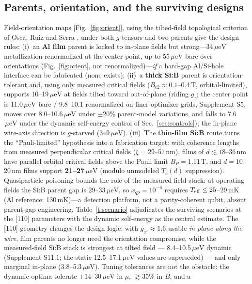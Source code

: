 \documentclass[11pt]{article}
\newcommand{\ueV}{\,\mu\mathrm{eV}}
\begin{document}
\subsection{Parents, orientation, and the surviving designs}\label{sec:parents}
Field-orientation maps [Fig.~\ref{fig:orient}], using the tilted-field
topological criterion of Osca, Ruiz and Serra \cite{osca}, under both
$g$-tensors and two parents give the design rules: (i)~an \textbf{Al film} parent is locked to in-plane fields but
strong---34$\ueV$ metallization-renormalized at the center point, up to
55$\ueV$ bare over orientations (Fig.~\ref{fig:orient}, not
renormalized)---\emph{if} a hard-gap Al/Si-hole
interface can be fabricated (none exists); (ii)~a \textbf{thick Si:B} parent
\cite{bustarret,prb2010,duvauchelle,chiodi2024} is orientation-tolerant and, using only
measured critical fields ($B_{c2} \approx 0.1$--0.4\,T, orbital-limited), supports
10--19$\ueV$ at fields tilted toward out-of-plane (riding $g_z$; the center
point is 11.0$\ueV$ bare / 9.8--10.1 renormalized on finer optimizer grids,
Supplement S5, moves over 8.0--10.6$\ueV$ under $\pm$20\% parent-model
variations, and falls to 7.6$\ueV$ under the dynamic self-energy control of
Sec.~\ref{sec:controls}); the in-plane
wire-axis direction is $g$-starved (3--9$\ueV$). (iii)~The \textbf{thin-film Si:B}
route turns the ``Pauli-limited'' hypothesis into a fabrication target: with coherence
lengths from measured perpendicular critical fields ($\xi = 29$--57\,nm), films of
$d \lesssim 18$--36\,nm have parallel orbital critical fields above the Pauli limit
$B_P = 1.11$\,T, and $d = 10$--20\,nm films support \textbf{21--27$\ueV$}
(modulo unmodeled $T_c(d)$ suppression). Quasiparticle poisoning bounds the role of the
measured-field stack: at operating fields the Si:B parent gap is 29--33$\ueV$, so
$x_{qp} = 10^{-6}$ requires $T_{\rm eff} \le 25$--29\,mK (Al reference: 130\,mK)---a
detection platform, not a parity-coherent qubit, absent parent-gap engineering.
Table~\ref{t:scenario} adjudicates the surviving scenarios at the [110]
parameters with the dynamic self-energy as the central estimate. The [110]
geometry changes the design logic: with $g_{x'} \approx 1.6$ usable
\emph{in-plane along the wire}, film parents no longer need the orientation
compromise, while the measured-field Si:B stack is strongest at tilted
field --- 8.4--10.5$\ueV$ dynamic (Supplement S11.1; the static
12.5--17.1$\ueV$ values are superseded) --- and only marginal in-plane
(3.8--5.3$\ueV$). Tuning tolerances are not the obstacle: the dynamic
optima tolerate $\pm14$--$30\ueV$ in $\mu$, $\gtrsim$35\% in $B$, and a
\end{document}
